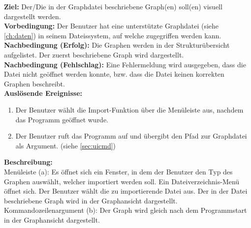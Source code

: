 \label{fa:import}
\textbf{Ziel:} Der/Die in der Graphdatei beschriebene Graph(en) soll(en) visuell dargestellt werden.\\
\textbf{Vorbedingung:} Der Benutzer hat eine unterstützte Graphdatei (siehe \ref{ch:daten}) in seinem Dateissystem, auf welche zugegriffen werden kann.\\
\textbf{Nachbedingung (Erfolg):} Die Graphen werden in der Strukturübersicht aufgelistet. Der zuerst beschriebene Graph wird dargestellt.\\
\textbf{Nachbedingung (Fehlschlag):}
Eine Fehlermeldung wird ausgegeben, dass die Datei nicht geöffnet werden konnte, bzw. dass die Datei keinen korrekten Graphen beschreibt.\\
\textbf{Auslösende Ereignisse:}
\begin{enumerate}[nolistsep, label=(\alph*)]
  \item Der Benutzer wählt die Import-Funktion über die Menüleiste aus, nachdem das Programm geöffnet wurde. %
  \item Der Benutzer ruft das Programm auf und übergibt den Pfad zur Graphdatei als Argument. (siehe \ref{sec:uicmd})
\end{enumerate}
\textbf{Beschreibung:}\\
Menüleiste (a):
Es öffnet sich ein Fenster, in dem der Benutzer den Typ des Graphen auswählt, welcher importiert werden soll. %
Ein Dateiverzeichnis-Menü öffnet sich. %
Der Benutzer wählt die zu importierende Datei aus.
Der in der Datei beschriebene Graph wird in der Graphansicht dargestellt.\\%
Kommandozeilenargument (b): Der Graph wird gleich nach dem Programmstart in der Graphansicht dargestellt. \\


